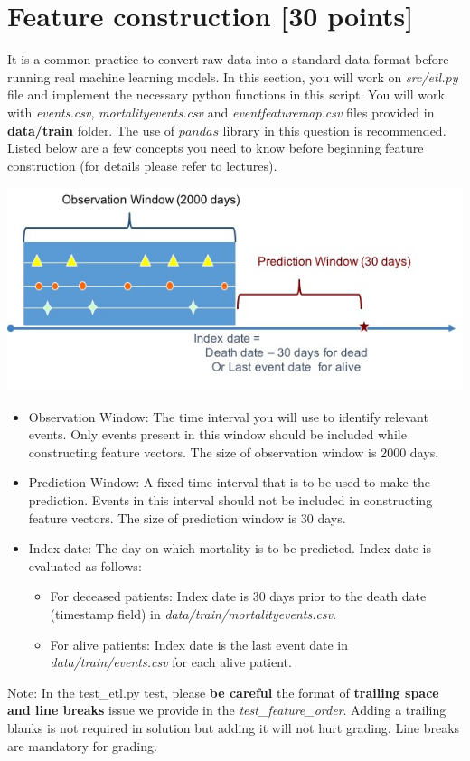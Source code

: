 \documentclass[12pt]{article}
\begin{document}
\section{Feature construction [30 points] }
It is a common practice to convert raw data into a standard data format before running real machine learning models. In this section, you will work on \textit{src/etl.py} file and implement the necessary python functions in this script. You will work with \textit{events.csv}, \textit{mortality\textunderscore events.csv} and \textit{event\textunderscore feature\textunderscore map.csv} files provided in \textbf{data/train} folder.  The use of $pandas$ library in this question is recommended. 
Listed below are a few concepts you need to know before beginning feature construction (for details please refer to lectures). 
\begin{center}
\includegraphics[width=.75\textwidth]{window.jpg}
\end{center}
\begin{itemize}
\item Observation Window: The time interval you will use to identify relevant events. Only events present in this window should be included while constructing  feature vectors. The size of observation window is 2000 days. 
\item Prediction Window: A fixed time interval that is to be used to make the prediction. Events in this interval should not be included in constructing feature vectors. The size of prediction window is 30 days. 
\item Index date: The day on which mortality is to be predicted. Index date is evaluated as follows:
\begin{itemize}
\item For deceased patients: Index date is 30 days prior to the death date (timestamp field) in \textit{data/train/mortality\textunderscore events.csv}. 
\item For alive patients: Index date is the last event date in \textit{data/train/events.csv} for each alive patient. 

\end{itemize}
\end{itemize}
Note: In the test\_etl.py test, please \textbf{be careful} the format of \textbf{trailing space and line breaks} issue we provide in the \textit{test\_feature\_order}. Adding a trailing blanks is not required in solution but adding it will not hurt grading. Line breaks are mandatory for grading. 
\end{document}
